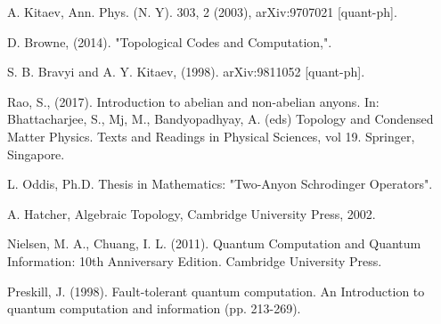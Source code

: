 \documentclass[12pt]{report}
\begin{document}
	\begin{minipage}{1 \textwidth}
		
	\end{minipage}
	
	\begin{minipage}{1 \textwidth}
		
	\end{minipage}
	
	

 
	
	\begin{thebibliography}{99} %
		 A. Kitaev, Ann. Phys. (N. Y). 303, 2 (2003),
		arXiv:9707021 [quant-ph].
		
		
		
		 D. Browne, (2014). "Topological Codes and Computation,".
		
		 S. B. Bravyi and A. Y. Kitaev, (1998).
		arXiv:9811052 [quant-ph].
		
		  Rao, S., (2017). Introduction to abelian and non-abelian anyons. In: Bhattacharjee, S., Mj, M., Bandyopadhyay, A. (eds) Topology and Condensed Matter Physics. Texts and Readings in Physical Sciences, vol 19. Springer, Singapore. %
		
		
		 L. Oddis, Ph.D. Thesis in Mathematics: "Two-Anyon Schrodinger Operators".
		
		 A. Hatcher, Algebraic Topology, Cambridge University Press, 2002.
		
		 Nielsen, M. A., Chuang, I. L. (2011). Quantum Computation and Quantum Information: 10th Anniversary Edition. Cambridge University Press.
		
		 Preskill, J. (1998). Fault-tolerant quantum computation. An Introduction to quantum computation and information (pp. 213-269).
		

\end{thebibliography}
\end{document}
